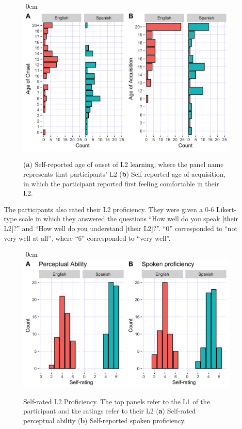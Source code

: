 \documentclass[preprints]{Definitions/mdpi}
\begin{document}
\begin{figure}[H]
\begin{adjustwidth}{-\extralength}{0cm}
\centering
\includegraphics[width=13.5cm]{figs/ao_aoa_combined.png}
\end{adjustwidth}
\caption{(\textbf{a}) Self-reported age of onset of L2 learning, where the panel name represents that participants' L2 (\textbf{b}) Self-reported age of acquisition, in which the participant reported first feeling comfortable in their L2.\label{ao_aoa}}
\end{figure}

The participants also rated their L2 proficiency.
They were given a 0-6 Likert-type scale in which they answered the questions ``How well do you speak {[}their L2{]}?'' and ``How well do you understand {[}their L2{]}?''.
``0'' corresponded to ``not very well at all'', where ``6'' corresponded to ``very well''.

\begin{figure}[H]
\begin{adjustwidth}{-\extralength}{0cm}
\centering
\includegraphics[width=13.5cm]{figs/proficiency_combined.png}
\end{adjustwidth}
\caption{Self-rated L2 Proficiency. The top panels refer to the L1 of the participant and the ratings refer to their L2 (\textbf{a}) Self-rated perceptual ability (\textbf{b}) Self-reported spoken proficiency. \label{fig_prof}}
\end{figure}
\end{document}

